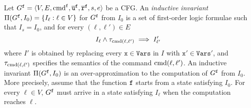 Let $G^{\mathtt{{f}}} = \langle V, E ,\textmd{cmd}^{\mathtt{{f}}},
\overline{\mathtt{u}}^{\mathtt{{f}}}, \overline{\mathtt{r}}^{\mathtt{{f}}},  s,
e \rangle$ be a CFG. An \emph{inductive invariant} $\Pi (G^{\mathtt{{f}}},
I_0) = \{ I_\ell : \ell \in V \}$ for $G^{\mathtt{{f}}}$ from $I_0$ is a
set of first-order logic formulae such that $I_s = I_0$, and
for every $(\ell, \ell') \in E$ 
\begin{equation*}
I_{\ell} \wedge \tau_{\textmd{cmd}(\ell, \ell')} \implies I'_{\ell'}
\end{equation*}
where $I'$ is obtained by replacing every $\mathtt{x} \in
\mathtt{Vars}$ in $I$ with $\mathtt{x}' \in \mathtt{Vars}'$, and
$\tau_{\textmd{cmd} (\ell, \ell')}$ specifies the semantics of the command
$\textmd{cmd} (\ell, \ell')$. An inductive invariant $\Pi
(G^{\mathtt{{f}}}, I_0)$ is an 
over-approximation to the computation of $G^{\mathtt{{f}}}$ from $I_0$. More
precisely, assume that the function ${\mathtt{{f}}}$ starts from a state satisfying
$I_0$. For every $\ell\in V$, $G^{\mathtt{{f}}}$ must arrive in a state
satisfying $I_{\ell}$ when the computation reaches $\ell$. 

